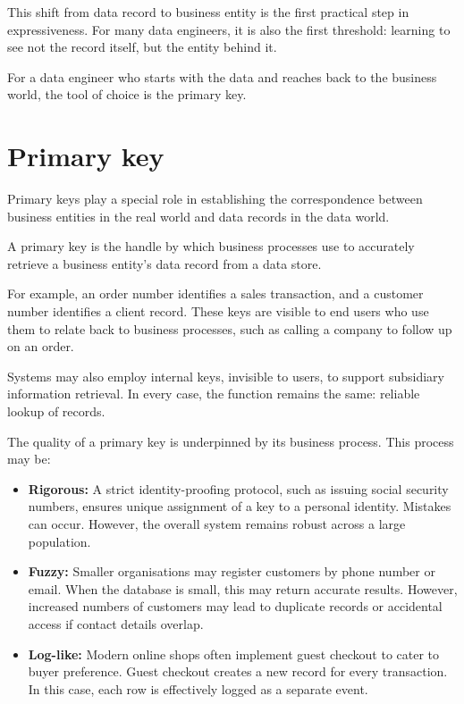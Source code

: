 \documentclass[10pt,openany,10pt]{book}
\providecommand{\tightlist}{%
  \setlength{\itemsep}{0pt}\setlength{\parskip}{0pt}}
\begin{document}
This shift from data record to business entity is the first practical
step in expressiveness. For many data engineers, it is also the first
threshold: learning to see not the record itself, but the entity behind
it.

For a data engineer who starts with the data and reaches back to the
business world, the tool of choice is the primary key.

\section{Primary key}\label{primary-key}

Primary keys play a special role in establishing the correspondence
between business entities in the real world and data records in the data
world.

A primary key is the handle by which business processes use to
accurately retrieve a business entity's data record from a data store.

For example, an order number identifies a sales transaction, and a
customer number identifies a client record. These keys are visible to
end users who use them to relate back to business processes, such as
calling a company to follow up on an order.

Systems may also employ internal keys, invisible to users, to support
subsidiary information retrieval. In every case, the function remains
the same: reliable lookup of records.

The quality of a primary key is underpinned by its business process.
This process may be:

\begin{itemize}
\tightlist
\item
  \textbf{Rigorous:} A strict identity-proofing protocol, such as
  issuing social security numbers, ensures unique assignment of a key to
  a personal identity. Mistakes can occur. However, the overall system
  remains robust across a large population.
\item
  \textbf{Fuzzy:} Smaller organisations may register customers by phone
  number or email. When the database is small, this may return accurate
  results. However, increased numbers of customers may lead to duplicate
  records or accidental access if contact details overlap.
\item
  \textbf{Log-like:} Modern online shops often implement guest checkout
  to cater to buyer preference. Guest checkout creates a new record for
  every transaction. In this case, each row is effectively logged as a
  separate event.
\end{itemize}
\end{document}
